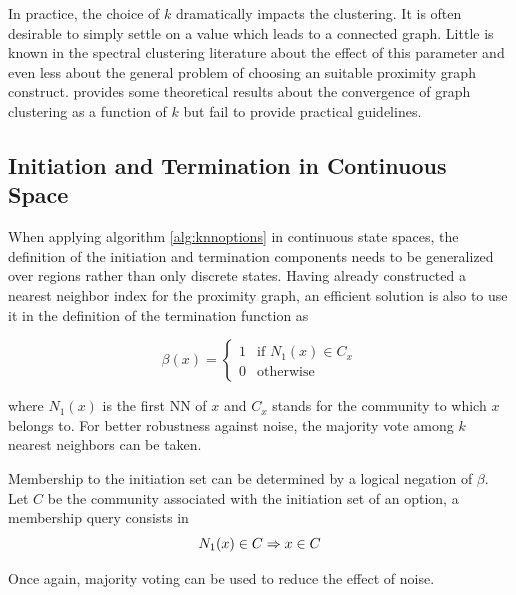 In practice, the choice of $k$ dramatically impacts the clustering. It is often desirable to simply settle on a value which leads to a connected graph. Little is known in the spectral clustering literature about the effect of this parameter and even less about the general problem of choosing an suitable proximity graph construct. \cite{Maier2008} provides some theoretical results about the convergence of graph clustering as a function of $k$ but fail to provide practical guidelines. 

\subsection{Initiation and Termination in Continuous Space}
\label{sec:knnoptions}
When applying algorithm \ref{alg:knnoptions} in continuous state spaces, the definition of the initiation and termination components needs to be generalized over regions rather than only discrete states. Having already constructed a nearest neighbor index for  the proximity graph, an efficient solution is also to use it in the definition of the termination function as

\begin{equation}
\beta(x) = 
\begin{cases}
1 & \text{if } N_1(x) \in C_x\\
0 & \text{otherwise}
\end{cases}
\end{equation}

where $N_1(x)$ is the first NN of $x$ and $C_x$ stands for the community to which $x$ belongs to. For better robustness against noise, the majority vote among $k$ nearest neighbors can be taken.

Membership to the initiation set can be determined by a logical negation of $\beta$. Let $C$ be the community associated with the initiation set of an option, a membership query consists in
\begin{equation}
N_1(x) \in C \Rightarrow x \in C  \\
\end{equation}

Once again, majority voting can be used to reduce the effect of noise. 

